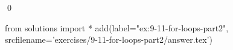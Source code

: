 
\begin{ex}
  \label{ex:9-11-for-loops-part2}
  
  \qed
\end{ex}
\begin{python0}
from solutions import *
add(label="ex:9-11-for-loops-part2",
    srcfilename='exercises/9-11-for-loops-part2/answer.tex')
\end{python0}
